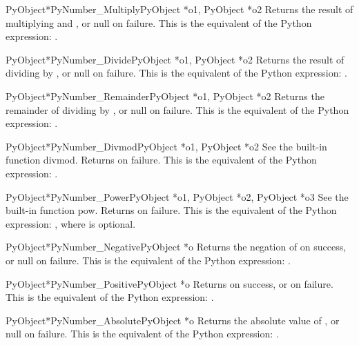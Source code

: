      \begin{cfuncdesc}{PyObject*}{PyNumber_Multiply}{PyObject *o1, PyObject *o2}
	 Returns the result of multiplying  and , or null on
	 failure.  This is the equivalent of the Python expression:
	 .
     \end{cfuncdesc}


     \begin{cfuncdesc}{PyObject*}{PyNumber_Divide}{PyObject *o1, PyObject *o2}
	 Returns the result of dividing  by , or null on failure.
	 This is the equivalent of the Python expression: .
     \end{cfuncdesc}


     \begin{cfuncdesc}{PyObject*}{PyNumber_Remainder}{PyObject *o1, PyObject *o2}
	 Returns the remainder of dividing  by , or null on
	 failure.  This is the equivalent of the Python expression:
	 .
     \end{cfuncdesc}


     \begin{cfuncdesc}{PyObject*}{PyNumber_Divmod}{PyObject *o1, PyObject *o2}
	 See the built-in function divmod.  Returns {\NULL} on failure.
	 This is the equivalent of the Python expression:
	 .
     \end{cfuncdesc}


     \begin{cfuncdesc}{PyObject*}{PyNumber_Power}{PyObject *o1, PyObject *o2, PyObject *o3}
	 See the built-in function pow.  Returns {\NULL} on failure.
	 This is the equivalent of the Python expression:
	 , where  is optional.
     \end{cfuncdesc}


     \begin{cfuncdesc}{PyObject*}{PyNumber_Negative}{PyObject *o}
	 Returns the negation of  on success, or null on failure.
	 This is the equivalent of the Python expression: .
     \end{cfuncdesc}


     \begin{cfuncdesc}{PyObject*}{PyNumber_Positive}{PyObject *o}
         Returns  on success, or {\NULL} on failure.
	 This is the equivalent of the Python expression: .
     \end{cfuncdesc}


     \begin{cfuncdesc}{PyObject*}{PyNumber_Absolute}{PyObject *o}
	 Returns the absolute value of , or null on failure.  This is
	 the equivalent of the Python expression: .
     \end{cfuncdesc}


